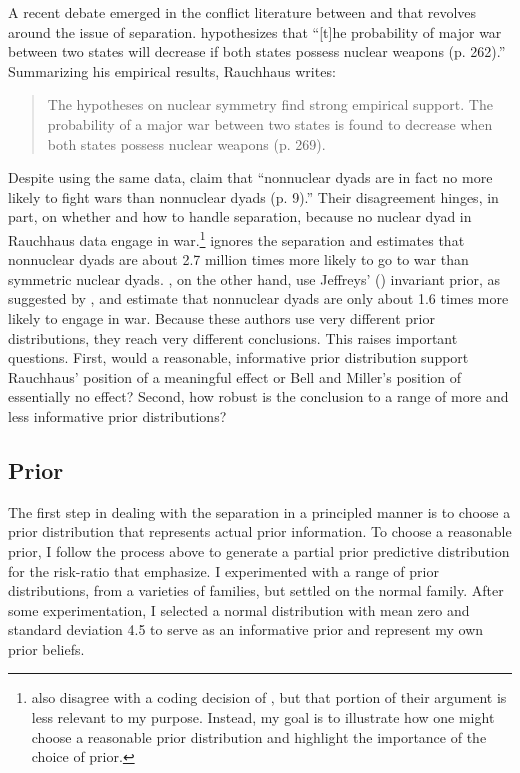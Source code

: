 \documentclass[12pt]{article}
\begin{document}
A recent debate emerged in the conflict literature between \cite{Rauchhaus2009} and \cite{BellMiller2014} that revolves around the issue of separation. \cite{Rauchhaus2009} hypothesizes that ``[t]he probability of major war between two states will decrease if both states possess nuclear weapons (p. 262).'' Summarizing his empirical results, Rauchhaus writes:

\begin{quote} 
The hypotheses on nuclear symmetry find strong empirical support. The probability of a major war between two states is found to decrease when both states possess nuclear weapons (p. 269).
\end{quote}

Despite using the same data, \cite{BellMiller2014} claim that ``nonnuclear dyads are in fact no more likely to fight wars than nonnuclear dyads (p. 9).'' Their disagreement hinges, in part, on whether and how to handle separation, because no nuclear dyad in Rauchhaus data engage in war.\footnote{\cite{BellMiller2014} also disagree with a coding decision of \cite{Rauchhaus2009}, but that portion of their argument is less relevant to my purpose. Instead, my goal is to illustrate how one might choose a reasonable prior distribution and highlight the importance of the choice of prior.} \cite{Rauchhaus2009} ignores the separation and estimates that nonnuclear dyads are about 2.7 million times more likely to go to war than symmetric nuclear dyads. \cite{BellMiller2014}, on the other hand, use Jeffreys' (\citeyear{Jeffreys1946}) invariant prior, as suggested by \cite{Zorn2005}, and estimate that nonnuclear dyads are only about 1.6 times more likely to engage in war. Because these authors use very different prior distributions, they reach very different conclusions. This raises important questions. First, would a reasonable, informative prior distribution support Rauchhaus' position of a meaningful effect or Bell and Miller's position of essentially no effect? Second, how robust is the conclusion to a range of more and less informative prior distributions?

\subsection*{Prior}

The first step in dealing with the separation in a principled manner is to choose a prior distribution that represents actual prior information. To choose a reasonable prior, I follow the process above to generate a partial prior predictive distribution for the risk-ratio that \cite{BellMiller2014} emphasize. I experimented with a range of prior distributions, from a varieties of families, but settled on the normal family. After some experimentation, I selected a normal distribution with mean zero and standard deviation 4.5 to serve as an informative prior and represent my own prior beliefs. 
\end{document}
